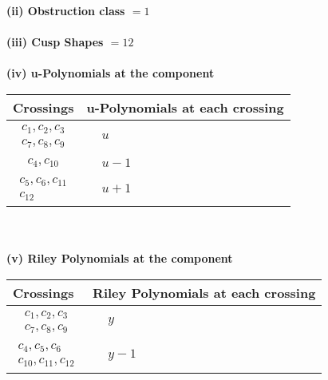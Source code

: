 \documentclass[1p]{elsarticle_modified}
\theoremstyle{definition}
\begin{document}
\flushleft \textbf{(ii) Obstruction class $= 1$}\\~\\
\flushleft \textbf{(iii) Cusp Shapes $= 12$}\\~\\
\newpage\renewcommand{\arraystretch}{1}
\flushleft \textbf{(iv) u-Polynomials at the component}\newline \\
\begin{tabular}{m{50pt}|m{274pt}}
Crossings & \hspace{64pt}u-Polynomials at each crossing \\
\hline $$\begin{aligned}c_{1},c_{2},c_{3}\\c_{7},c_{8},c_{9}\end{aligned}$$&$\begin{aligned}
&u
\end{aligned}$\\
\hline $$\begin{aligned}c_{4},c_{10}\end{aligned}$$&$\begin{aligned}
&u-1
\end{aligned}$\\
\hline $$\begin{aligned}c_{5},c_{6},c_{11}\\c_{12}\end{aligned}$$&$\begin{aligned}
&u+1
\end{aligned}$\\
\hline
\end{tabular}\\~\\
\newpage\renewcommand{\arraystretch}{1}
\flushleft \textbf{(v) Riley Polynomials at the component}\newline \\
\begin{tabular}{m{50pt}|m{274pt}}
Crossings & \hspace{64pt}Riley Polynomials at each crossing \\
\hline $$\begin{aligned}c_{1},c_{2},c_{3}\\c_{7},c_{8},c_{9}\end{aligned}$$&$\begin{aligned}
&y
\end{aligned}$\\
\hline $$\begin{aligned}c_{4},c_{5},c_{6}\\c_{10},c_{11},c_{12}\end{aligned}$$&$\begin{aligned}
&y-1
\end{aligned}$\\
\hline
\end{tabular}\\~\\
\end{document}
